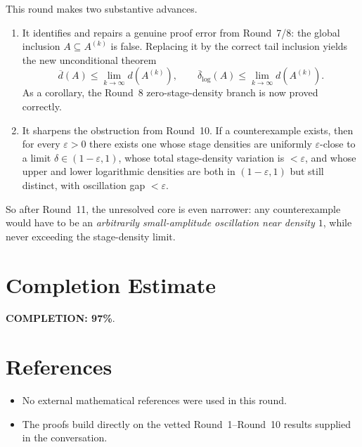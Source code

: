 This round makes two substantive advances.

\begin{enumerate}
\item It identifies and repairs a genuine proof error from Round~7/8: the global inclusion $A\subseteq A^{(k)}$ is false.  Replacing it by the correct tail inclusion yields the new unconditional theorem
\[
\overline d(A)\le \lim_{k\to\infty} d(A^{(k)}),
\qquad
\overline\delta_{\log}(A)\le \lim_{k\to\infty} d(A^{(k)}).
\]
As a corollary, the Round~8 zero-stage-density branch is now proved correctly.

\item It sharpens the obstruction from Round~10.  If a counterexample exists, then for every $\varepsilon>0$ there exists one whose stage densities are uniformly $\varepsilon$-close to a limit $\delta\in(1-\varepsilon,1)$, whose total stage-density variation is $<\varepsilon$, and whose upper and lower logarithmic densities are both in $(1-\varepsilon,1)$ but still distinct, with oscillation gap $<\varepsilon$.
\end{enumerate}

So after Round~11, the unresolved core is even narrower: any counterexample would have to be an \emph{arbitrarily small-amplitude oscillation near density $1$}, while never exceeding the stage-density limit.

\section{Completion Estimate}
\textbf{COMPLETION: 97\%}.

\section{References}
\begin{itemize}
\item No external mathematical references were used in this round.
\item The proofs build directly on the vetted Round~1--Round~10 results supplied in the conversation.
\end{itemize}
